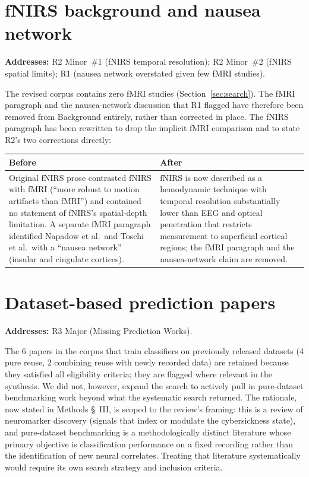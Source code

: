 \documentclass[11pt,a4paper]{article}
\makeatletter
\newcommand{\diffbox}[2]{%
  \begin{center}
  \small
  \begin{tabular}{@{}p{0.46\textwidth}@{\hspace{2em}}p{0.46\textwidth}@{}}
  \toprule
  \textbf{Before} & \textbf{After} \\
  \midrule
  #1 & #2 \\
  \bottomrule
  \end{tabular}
  \end{center}}
\newcommand{\addresses}[1]{\par\noindent\textbf{\small Addresses:} {\small #1}\par\smallskip}
\makeatother
\begin{document}
\section{fNIRS background and nausea network}\label{sec:fnirs}
\addresses{R2 Minor~\#1 (fNIRS temporal resolution); R2 Minor~\#2 (fNIRS spatial limits); R1 (nausea network overstated given few fMRI studies).}

The revised corpus contains zero fMRI studies (Section~\ref{sec:search}). The fMRI paragraph and the nausea-network discussion that R1 flagged have therefore been removed from Background entirely, rather than corrected in place. The fNIRS paragraph has been rewritten to drop the implicit fMRI comparison and to state R2's two corrections directly:

\diffbox{Original fNIRS prose contrasted fNIRS with fMRI (``more robust to motion artifacts than fMRI'') and contained no statement of fNIRS's spatial-depth limitation. A separate fMRI paragraph identified Napadow et al.\ and Toschi et al.\ with a ``nausea network'' (insular and cingulate cortices).}{fNIRS is now described as a hemodynamic technique with temporal resolution substantially lower than EEG and optical penetration that restricts measurement to superficial cortical regions; the fMRI paragraph and the nausea-network claim are removed.}

\section{Dataset-based prediction papers}\label{sec:datasets}
\addresses{R3 Major (Missing Prediction Works).}

The 6 papers in the corpus that train classifiers on previously released datasets (4 pure reuse, 2 combining reuse with newly recorded data) are retained because they satisfied all eligibility criteria; they are flagged where relevant in the synthesis. We did not, however, expand the search to actively pull in pure-dataset benchmarking work beyond what the systematic search returned. The rationale, now stated in Methods \S~III, is scoped to the review's framing: this is a review of neuromarker discovery (signals that index or modulate the cybersickness state), and pure-dataset benchmarking is a methodologically distinct literature whose primary objective is classification performance on a fixed recording rather than the identification of new neural correlates. Treating that literature systematically would require its own search strategy and inclusion criteria.
\end{document}
